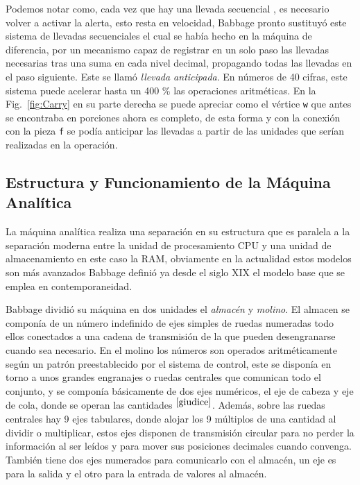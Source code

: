 \documentclass[runningheads,a4paper]{llncs}
\begin{document}
Podemos notar como, cada vez que hay una llevada secuencial , es necesario volver a activar la
alerta, esto resta en velocidad, Babbage pronto sustituyó este sistema de llevadas secuenciales el cual 
se había hecho en la máquina de diferencia, por un mecanismo capaz de registrar en un solo paso las
llevadas necesarias tras una suma en cada nivel decimal, propagando todas las llevadas en el paso siguiente. 
Este se llamó \emph{llevada anticipada}. En números de 40 cifras, este sistema puede acelerar hasta un 
400 \% las operaciones aritméticas. En la Fig.~\ref{fig:Carry} en su parte derecha se puede apreciar como 
el vértice \verb*|w| que antes se encontraba en porciones ahora es completo, de esta forma y con la conexión 
con la pieza \verb*|f| se podía anticipar las llevadas a partir de las unidades que serían realizadas en 
la operación.

\subsection*{Estructura y Funcionamiento de la Máquina Analítica}

La máquina analítica realiza una separación en su estructura que es paralela a la separación moderna entre 
la unidad de procesamiento CPU y una unidad de almacenamiento en este caso la RAM, obviamente en la 
actualidad estos modelos son más avanzados Babbage definió ya desde el siglo XIX el modelo base que se 
emplea en contemporaneidad.

Babbage dividió su máquina en dos unidades el \emph{almacén} y \emph{molino}. El almacen se componía de un
número indefinido de ejes simples de ruedas numeradas todo ellos conectados a una cadena de transmisión de 
la que pueden desengranarse cuando sea necesario. En el molino los números son operados aritméticamente 
según un patrón preestablecido por el sistema de control, este se disponía en torno a unos grandes engranajes 
o ruedas centrales que comunican todo el conjunto, y se componía básicamente de dos ejes numéricos, el eje
de cabeza y eje de cola, donde se operan las cantidades $^{\cite{giudice}}$. Además, sobre las ruedas centrales hay 9 ejes tabulares, donde alojar los 9 múltiplos de una cantidad al dividir o multiplicar, estos ejes disponen de 
transmisión circular para no perder la información al ser leídos y para mover sus posiciones decimales 
cuando convenga. También tiene dos ejes numerados para comunicarlo con el almacén, un eje es para la salida
y el otro para la entrada de valores al almacén.
\end{document}
